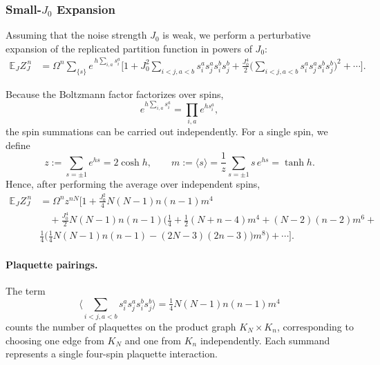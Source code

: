 \documentclass{article}
\theoremstyle{plain}
\begin{document}
\subsubsection{Small-\texorpdfstring{$J_0$}{J0} Expansion}\label{app:smallJ}

Assuming that the noise strength \(J_0\) is weak, we perform a perturbative expansion of the replicated partition function in powers of \(J_0\):
\begin{align}
\mathbb{E}_J Z_J^{\,n}
&= \Omega^{n} \sum_{\{s\}}
e^{\,h \sum_{i,a} s_i^a}
\Bigg[
1 + J_0^2
\sum_{i<j,a<b}
s_i^a s_j^a s_i^b s_j^b
+ \frac{J_0^4}{2}
\Bigg(\sum_{i<j,a<b}
s_i^a s_j^a s_i^b s_j^b\Bigg)^{\!2}
+ \cdots
\Bigg].
\end{align}

Because the Boltzmann factor factorizes over spins,
\[
e^{h \sum_{i,a}s_i^a} = \prod_{i,a} e^{h s_i^a},
\]
the spin summations can be carried out independently. For a single spin, we define
\begin{equation}
z := \sum_{s=\pm1} e^{hs} = 2\cosh h,
\qquad
m := \langle s \rangle = \frac{1}{z}\sum_{s=\pm1} s\, e^{hs} = \tanh h.
\end{equation}
Hence, after performing the average over independent spins,
\begin{align}
\mathbb{E}_J Z_J^{\,n}
&= \Omega^{n} z^{nN}
\Bigg[
1 + \frac{J_0^2}{4}N(N-1)n(n-1)m^4 \nonumber\\
&\quad
+ \frac{J_0^4}{2} N(N-1)n(n-1)
\Big(
\tfrac14 + \tfrac12 (N+n-4)m^4 + (N-2)(n-2)m^6
+ \\
&\tfrac14 \big(\tfrac14 N(N-1)n(n-1) - (2N-3)(2n-3)\big)m^8
\Big)
+ \cdots
\Bigg].
\label{eq:ZJn-expand}
\end{align}

\paragraph{Plaquette pairings.}
The term
\[
\big\langle \sum_{i<j,a<b}s_i^a s_j^a s_i^b s_j^b \big\rangle
= \tfrac{1}{4} N(N-1)n(n-1) m^4
\]
counts the number of plaquettes on the product graph \(K_N \times K_n\),
corresponding to choosing one edge from \(K_N\) and one from \(K_n\) independently.
Each summand represents a single four-spin plaquette interaction.
\end{document}
